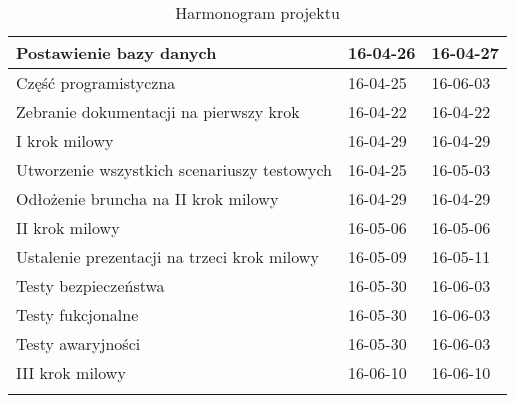 \begin{longtable}{| p{} || p{} | p{} |}
Postawienie bazy danych & 16-04-26 & 16-04-27 \\ \hline
Część programistyczna & 16-04-25 & 16-06-03 \\ \hline
Zebranie dokumentacji na pierwszy krok & 16-04-22 & 16-04-22 \\ \hline
I krok milowy & 16-04-29 & 16-04-29 \\ \hline
Utworzenie wszystkich scenariuszy testowych & 16-04-25 & 16-05-03 \\ \hline
Odłożenie bruncha na II krok milowy & 16-04-29 & 16-04-29 \\ \hline
II krok milowy & 16-05-06 & 16-05-06 \\ \hline
Ustalenie prezentacji na trzeci krok milowy & 16-05-09 & 16-05-11 \\ \hline
Testy bezpieczeństwa & 16-05-30 & 16-06-03 \\ \hline
Testy fukcjonalne & 16-05-30 & 16-06-03 \\ \hline
Testy awaryjności & 16-05-30 & 16-06-03 \\ \hline
III krok milowy & 16-06-10 & 16-06-10 \\ \hline
\caption{Harmonogram projektu}
\label{tab:harmonogram}
\end{longtable} 



